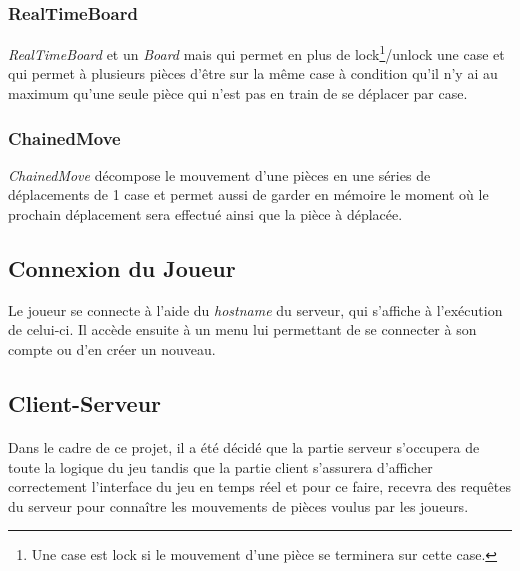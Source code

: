 \documentclass[10pt, a4paper]{article}
\begin{document}
\subsubsection{RealTimeBoard}
\textit{RealTimeBoard} et un \textit{Board} mais qui permet en plus de lock\footnote{Une case est lock si le mouvement d'une pièce se terminera sur cette case.}/unlock une case et qui permet à plusieurs pièces d'être sur la même case à condition qu'il n'y ai au maximum qu'une seule pièce qui n'est pas en train de se déplacer par case.

\subsubsection{ChainedMove}
\textit{ChainedMove} décompose le mouvement d'une pièces en une séries de déplacements de 1 case et permet aussi de garder en mémoire le moment où le prochain déplacement sera effectué ainsi que la pièce à déplacée.

\newpage

\subsection{Connexion du Joueur}
Le joueur se connecte à l'aide du \textit{hostname} du serveur, qui s'affiche à l'exécution de celui-ci. Il accède ensuite à un menu lui permettant de se connecter à son compte ou d'en créer un nouveau.


\subsection{Client-Serveur}
\paragraph{}Dans le cadre de ce projet, il a été décidé que la partie serveur s'occupera de toute la logique du jeu tandis que la partie client s'assurera d'afficher correctement l'interface du jeu en temps réel et pour ce faire, recevra des requêtes du serveur pour connaître les mouvements de pièces voulus par les joueurs.
\end{document}
